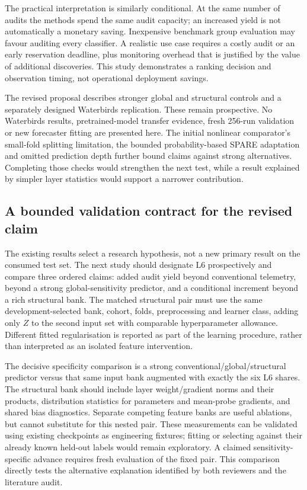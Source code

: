 \documentclass[nolineno]{ieeeaccess}
\begin{document}
The practical interpretation is similarly conditional. At the same number of audits the methods spend the same audit capacity; an increased yield is not automatically a monetary saving. Inexpensive benchmark group evaluation may favour auditing every classifier. A realistic use case requires a costly audit or an early reservation deadline, plus monitoring overhead that is justified by the value of additional discoveries. This study demonstrates a ranking decision and observation timing, not operational deployment savings.

The revised proposal describes stronger global and structural controls and a separately designed Waterbirds replication. These remain prospective. No Waterbirds results, pretrained-model transfer evidence, fresh 256-run validation or new forecaster fitting are presented here. The initial nonlinear comparator's small-fold splitting limitation, the bounded probability-based SPARE adaptation and omitted prediction depth further bound claims against strong alternatives. Completing those checks would strengthen the next test, while a result explained by simpler layer statistics would support a narrower contribution.


\subsection{A bounded validation contract for the revised claim}
The existing results select a research hypothesis, not a new primary result on the consumed test set. The next study should designate L6 prospectively and compare three ordered claims: added audit yield beyond conventional telemetry, beyond a strong global-sensitivity predictor, and a conditional increment beyond a rich structural bank. The matched structural pair must use the same development-selected bank, cohort, folds, preprocessing and learner class, adding only $Z$ to the second input set with comparable hyperparameter allowance. Different fitted regularisation is reported as part of the learning procedure, rather than interpreted as an isolated feature intervention.

The decisive specificity comparison is a strong conventional/global/structural predictor versus that same input bank augmented with exactly the six L6 shares. The structural bank should include layer weight/gradient norms and their products, distribution statistics for parameters and mean-probe gradients, and shared bias diagnostics. Separate competing feature banks are useful ablations, but cannot substitute for this nested pair. These measurements can be validated using existing checkpoints as engineering fixtures; fitting or selecting against their already known held-out labels would remain exploratory. A claimed sensitivity-specific advance requires fresh evaluation of the fixed pair. This comparison directly tests the alternative explanation identified by both reviewers and the literature audit.
\end{document}
